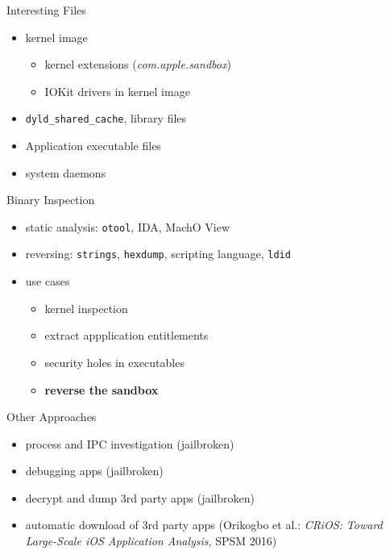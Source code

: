 \documentclass{simple}
\begin{document}
\begin{frame}{Interesting Files}
  \begin{itemize}
    \pause \item kernel image
      \begin{itemize}
        \item kernel extensions (\textit{com.apple.sandbox})
        \item IOKit drivers in kernel image
      \end{itemize}
    \item \texttt{dyld_shared_cache}, library files
    \item Application executable files
    \item system daemons
  \end{itemize}
\end{frame}

\begin{frame}{Binary Inspection}
  \begin{itemize}
    \item static analysis: \texttt{otool}, IDA, MachO View
    \item reversing: \texttt{strings}, \texttt{hexdump}, scripting language, \texttt{ldid}
    \item use cases
      \begin{itemize}
        \item kernel inspection
        \item extract appplication entitlements
        \item security holes in executables
        \item \textbf{reverse the sandbox}
      \end{itemize}
  \end{itemize}
\end{frame}

\begin{frame}{Other Approaches}
  \begin{itemize}
    \item process and IPC investigation (jailbroken)
    \item debugging apps (jailbroken)
    \item decrypt and dump 3rd party apps (jailbroken)
    \item automatic download of 3rd party apps (Orikogbo et al.: \textit{CRiOS: Toward Large-Scale iOS Application Analysis}, SPSM 2016)
  \end{itemize}
\end{frame}
\end{document}
